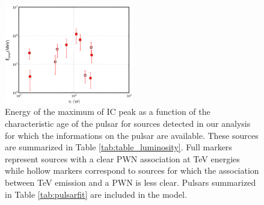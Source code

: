 \begin{figure}[h!]
\centering
\includegraphics[width=0.5\textwidth]{figures/E_cut_vs_age.eps}
\caption{Energy of the maximum of IC peak as a function of the characteristic age of the pulsar for sources detected in our analysis for which the informations on the pulsar are available. These sources are summarized in Table \ref{tab:table_luminosity}. Full markers represent sources with a clear PWN association at TeV energies while hollow markers correspond to sources for which the association between TeV emission and a PWN is less clear. Pulsars summarized in Table \ref{tab:pulsarfit} are included in the model.
\label{fig:Epeakage}}
\end{figure}

\clearpage

